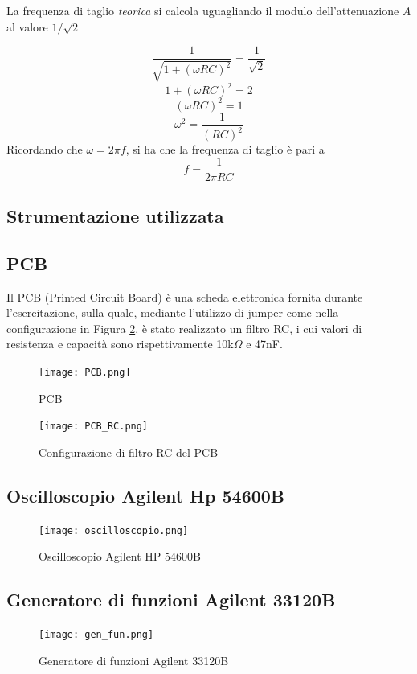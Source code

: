 La frequenza di taglio \emph{teorica} si calcola uguagliando il modulo dell'attenuazione $A$ al valore $1/\sqrt{2}$

\[\frac{1}{\sqrt{1+(\omega RC)^2}} = \frac{1}{\sqrt{2}}\]
\[1+(\omega RC)^2 = 2\] 
\[(\omega RC)^2 = 1\]
\[\omega ^2 = \frac{1}{(RC)^2}\]
Ricordando che $\omega = 2\pi f$, si ha che la frequenza di taglio è pari a 
\[f=\frac{1}{2\pi RC}\]

\subsection{Strumentazione utilizzata}
\subsection*{PCB}
Il PCB (Printed Circuit Board) è una scheda elettronica fornita durante l'esercitazione, sulla quale, mediante l'utilizzo di jumper come nella configurazione in Figura \ref{fig:pcb_rc}, è stato realizzato un filtro RC, i cui valori di resistenza e capacità sono rispettivamente 10k$\Omega$ e 47nF.

\begin{figure}[h]
    \centering
    \texttt{[image: PCB.png]} 
    \caption{PCB}
    \label{fig:pcb}
\end{figure}

\begin{figure}[h]
    \centering
    \texttt{[image: PCB\_RC.png]}
    \caption{Configurazione di filtro RC del PCB}
    \label{fig:pcb_rc}
\end{figure}
\FloatBarrier

\clearpage
\subsection*{Oscilloscopio Agilent Hp 54600B}
\begin{figure}[h]
    \centering
    \texttt{[image: oscilloscopio.png]}
    \caption{Oscilloscopio Agilent HP 54600B}
    \label{fig:enter-label}
\end{figure}
\FloatBarrier

\subsection*{Generatore di funzioni Agilent 33120B}
\begin{figure}[h]
    \centering
    \texttt{[image: gen\_fun.png]}
    \caption{Generatore di funzioni Agilent 33120B}
    \label{fig:gen_fun}
\end{figure}
\FloatBarrier
\clearpage

